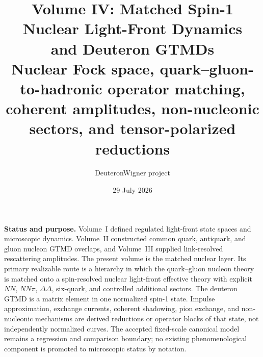 \documentclass[11pt]{article}
\title{\vspace{-1.0cm}
{\color{navy}\bfseries Volume IV: Matched Spin-1 Nuclear Light-Front Dynamics\\[2mm]
and Deuteron GTMDs}\\[4mm]
\large Nuclear Fock space, quark--gluon-to-hadronic operator matching,\\
coherent amplitudes, non-nucleonic sectors, and tensor-polarized reductions}
\author{DeuteronWigner project}
\date{29 July 2026}
\begin{document}
\maketitle

\begin{center}
\begin{minipage}{0.94\textwidth}
\colorbox{softblue}{\parbox{0.96\textwidth}{
\textbf{Status and purpose.}
Volume~I defined regulated light-front state spaces and microscopic dynamics.
Volume~II constructed common quark, antiquark, and gluon nucleon GTMD overlaps,
and Volume~III supplied link-resolved rescattering amplitudes.  The present
volume is the matched nuclear layer.  Its primary realizable route is a
hierarchy in which the quark--gluon nucleon theory is matched onto a
spin-resolved nuclear light-front effective theory with explicit
\(NN\), \(NN\pi\), \(\Delta\Delta\), six-quark, and controlled additional
sectors.  The deuteron GTMD is a matrix element in one normalized spin-1 state.
Impulse approximation, exchange currents, coherent shadowing, pion exchange,
and non-nucleonic mechanisms are derived reductions or operator blocks of
that state, not independently normalized curves.  The accepted fixed-scale
canonical model remains a regression and comparison boundary; no existing
phenomenological component is promoted to microscopic status by notation.
}}
\end{minipage}
\end{center}
\end{document}
